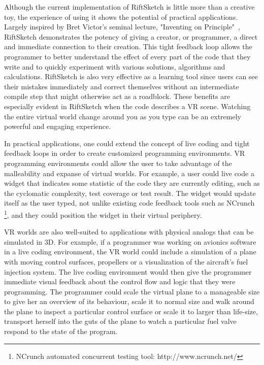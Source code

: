 \documentclass{acm_proc_article-sp}
\begin{document}
Although the current implementation of RiftSketch is little more than a creative toy, the experience of using it shows the potential of practical applications. Largely inspired by Bret Victor's seminal lecture, "Inventing on Principle"~\cite{Victor:InventingOnPrincipleVideo}\cite{Victor:InventingOnPrincipleTranscript}, RiftSketch demonstrates the potency of giving a creator, or programmer, a direct and immediate connection to their creation. This tight feedback loop allows the programmer to better understand the effect of every part of the code that they write and to quickly experiment with various solutions, algorithms and calculations. RiftSketch is also very effective as a learning tool since users can see their mistakes immediately and correct themselves without an intermediate compile step that might otherwise act as a roadblock.  These benefits are especially evident in RiftSketch when the code describes a VR scene. Watching the entire virtual world change around you as you type can be an extremely powerful and engaging experience.

In practical applications, one could extend the concept of live coding and tight feedback loops in order to create customized programming environments. VR programming environments could allow the user to take advantage of the malleability and expanse of virtual worlds. For example, a user could live code a widget that indicates some statistic of the code they are currently editing, such as the cyclomatic complexity, test coverage or test result. The widget would update itself as the user typed, not unlike existing code feedback tools such as NCrunch \footnote{NCrunch automated concurrent testing tool: http://www.ncrunch.net/}, and they could position the widget in their virtual periphery.

VR worlds are also well-suited to applications with physical analogs that can be simulated in 3D. For example, if a programmer was working on avionics software in a live coding environment, the VR world could include a simulation of a plane with moving control surfaces, propellers or a visualization of the aircraft's fuel injection system. The live coding environment would then give the programmer immediate visual feedback about the control flow and logic that they were programming. The programmer could scale the virtual plane to a manageable size to give her an overview of its behaviour, scale it to normal size and walk around the plane to inspect a particular control surface or scale it to larger than life-size, transport herself into the guts of the plane to watch a particular fuel valve respond to the state of the program.
\end{document}
